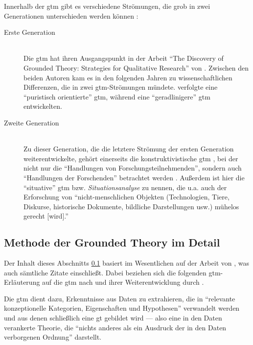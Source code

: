 Innerhalb der \gls{gtm} gibt es verschiedene Strömungen, die grob in zwei Generationen unterschieden werden können \citep{Mey:2011iy}:
\begin{description}
  \item[Erste Generation] \hfill \\
  Die \gls{gtm} hat ihren Ausgangspunkt in der Arbeit ``The Discovery of Grounded Theory: Strategies for Qualitative Research'' von \cite{Glaser:1967ts}. Zwischen den beiden Autoren kam es in den folgenden Jahren zu wissenschaftlichen Differenzen, die in zwei \gls{gtm}-Strömungen mündete. \cite{glaser1978theoretical} verfolgte eine ``puristisch orientierte'' \citep{Haselhoff:2010gj} \gls{gtm}, während \cite{strauss1987qualitative,strauss1990basics} eine ``geradlinigere'' \citep{Salinger:2013vd} \gls{gtm} entwickelten.
  \item[Zweite Generation] \hfill \\
  Zu dieser Generation, die die letztere Strömung der ersten Generation weiterentwickelte, gehört einerseits die konstruktivistische \gls{gtm} \citep{charmaz2006constructing,bryant2010sage}, bei der nicht nur die ``Handlungen von Forschungsteilnehmenden'', sondern auch ``Handlungen der Forschenden'' betrachtet werden \citep[][S. 188]{Mey:2011iy}. Außerdem ist hier die ``situative'' \gls{gtm} bzw. \textit{Situationsanalyse} \citep{clarke2005situational} zu nennen, die u.a. auch der Erforschung von ``nicht-menschlichen Objekten (Technologien, Tiere, Diskurse, historische Dokumente, bildliche Darstellungen usw.) mühelos gerecht [wird].'' \citep[][S. 209]{Mey:2011iy} 
\end{description}



\subsection{Methode der Grounded Theory im Detail}
\label{sec:gtm-detail}

Der Inhalt dieses Abschnitts \ref{sec:gtm-detail} basiert im Wesentlichen auf der Arbeit von \cite{Salinger:2013vd}, was auch sämtliche Zitate einschließt. Dabei beziehen sich die folgenden \gls{gtm}-Erläuterung auf die \gls{gtm} nach \cite{Glaser:1967ts} und ihrer Weiterentwicklung durch \cite{strauss1990basics}.

Die \gls{gtm} dient dazu, Erkenntnisse aus Daten zu extrahieren, die in ``relevante konzeptionelle Kategorien, Eigenschaften und Hypothesen'' verwandelt werden und aus denen schließlich eine \gls{gt} gebildet wird --- also eine in den Daten verankerte Theorie, die ``nichts anderes als ein Ausdruck der in den Daten verborgenen Ordnung'' \citep[][S. 50]{glaser2005grounded} darstellt.

